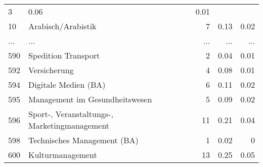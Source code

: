 \begin{longtable}{lXrrr}
          \num{3} &
          \num[round-mode=places,round-precision=2]{0,06} &
          \num[round-mode=places,round-precision=2]{0,01} \\
        10 & \multicolumn{1}{X}{Arabisch/Arabistik} & %
          \num{7} &
          \num[round-mode=places,round-precision=2]{0,13} &
          \num[round-mode=places,round-precision=2]{0,02} \\
       ... & ... & ... & ... & ... \\
        590 & \multicolumn{1}{X}{Spedition Transport} & %
          \num{2} &
          \num[round-mode=places,round-precision=2]{0,04} &
          \num[round-mode=places,round-precision=2]{0,01} \\

        592 & \multicolumn{1}{X}{Versicherung} & %
          \num{4} &
          \num[round-mode=places,round-precision=2]{0,08} &
          \num[round-mode=places,round-precision=2]{0,01} \\

        594 & \multicolumn{1}{X}{Digitale Medien (BA)} & %
          \num{6} &
          \num[round-mode=places,round-precision=2]{0,11} &
          \num[round-mode=places,round-precision=2]{0,02} \\

        595 & \multicolumn{1}{X}{Management im Gesundheitswesen} & %
          \num{5} &
          \num[round-mode=places,round-precision=2]{0,09} &
          \num[round-mode=places,round-precision=2]{0,02} \\

        596 & \multicolumn{1}{X}{Sport-, Veranstaltungs-, Marketingmanagement} & %
          \num{11} &
          \num[round-mode=places,round-precision=2]{0,21} &
          \num[round-mode=places,round-precision=2]{0,04} \\

        598 & \multicolumn{1}{X}{Technisches Management (BA)} & %
          \num{1} &
          \num[round-mode=places,round-precision=2]{0,02} &
          \num[round-mode=places,round-precision=2]{0} \\

        600 & \multicolumn{1}{X}{Kulturmanagement} & %
          \num{13} &
          \num[round-mode=places,round-precision=2]{0,25} &
          \num[round-mode=places,round-precision=2]{0,05} \\


\end{longtable}
